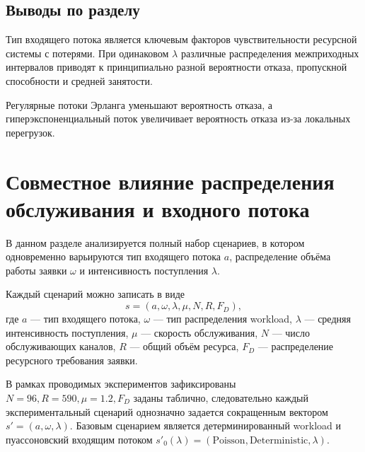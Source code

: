 \subsection*{Выводы по разделу}

Тип входящего потока является ключевым факторов чувствительности ресурсной системы с потерями\cite{paxson_floyd_1995_poisson_failure,vishnevskii_dudin_correlated_arrivals_2017}. При одинаковом $\lambda$ различные распределения межприходных интервалов приводят к принципиально разной вероятности отказа, пропускной способности и средней занятости.

Регулярные потоки Эрланга уменьшают вероятность отказа, а гиперэкспоненциальный поток увеличивает вероятность отказа из-за локальных перегрузок. 

%

\section{Совместное влияние распределения обслуживания и входного потока}
\label{sec:combined_sensitivity_results}

В данном разделе анализируется полный набор сценариев, в котором одновременно варьируются тип входящего потока $a$, распределение объёма работы заявки $\omega$ и интенсивность поступления $\lambda$.

Каждый сценарий можно записать в виде
$$
s = (a, \omega, \lambda, \mu, N, R, F_D),
$$
где $a$ --- тип входящего потока, $\omega$ --- тип распределения workload, $\lambda$ --- средняя интенсивность поступления, $\mu$ --- скорость обслуживания, $N$ --- число обслуживающих каналов, $R$ --- общий объём ресурса, $F_D$ --- распределение ресурсного требования заявки. 

В рамках проводимых экспериментов зафиксированы $N = 96, R = 590, \mu = 1.2, F_D$ заданы таблично, следовательно каждый экспериментальный сценарий однозначно задается сокращенным вектором $s' = (a, \omega, \lambda)$. Базовым сценарием является детерминированный workload и пуассоновский входящим потоком $
s'_0(\lambda) = (\text{Poisson}, \text{Deterministic}, \lambda)$.

